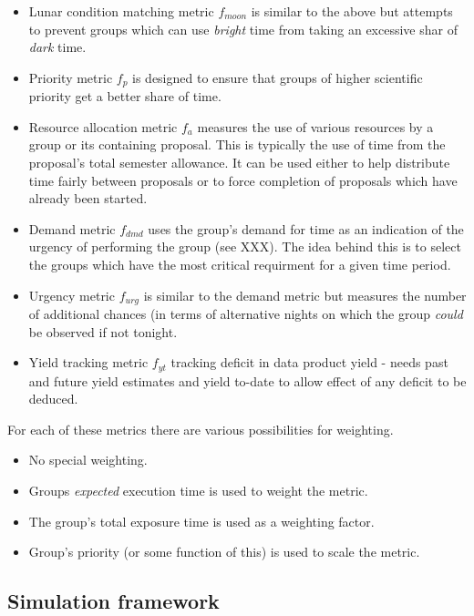 \begin{itemize}
\item Lunar condition matching metric $f_{moon}$ is similar to the above but attempts to prevent groups which can use \emph{bright} time from taking an excessive shar of \emph{dark} time.

\item Priority metric $f_p$ is designed to ensure that groups of higher scientific priority get a better share of time. 

\item Resource allocation metric $f_{a}$ measures the use of various resources by a group or its containing proposal. This is typically the use of time from the proposal's total semester allowance. It can be used either to help distribute time fairly between proposals or to force completion of proposals which have already been started.

\item Demand metric $f_{dmd}$ uses the group's demand for time as an indication of the urgency of performing the group (see XXX). The idea behind this is to select the groups which have the most critical requirment for a given time period.

\item Urgency metric $f_{urg}$ is similar to the demand metric but measures the number of additional chances (in terms of alternative nights on which the group \emph{could} be observed if not tonight.

\item Yield tracking metric $f_{yt}$ tracking deficit in data product yield - needs past and future yield estimates and yield to-date to allow effect of any deficit to be deduced.

\end{itemize}
 
For each of these metrics there are various possibilities for weighting.

\begin{itemize}
\item No special weighting.
\item Groups \emph{expected} execution time is used to weight the metric.
\item The group's total exposure time is used as a weighting factor.
\item Group's priority (or some function of this) is used to scale the metric.
\end{itemize}



\subsection{Simulation framework}

